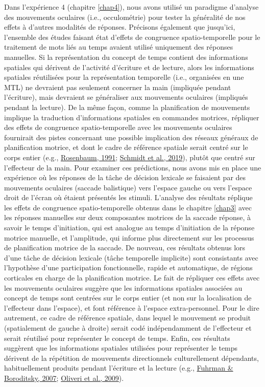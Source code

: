 \documentclass[
  a4paper,12pt,twoside,onecolumn,openright,final,oldfontcommands]{memoir}
\begin{document}
Dans l'expérience 4 (chapitre \ref{chap4}), nous avons utilisé un paradigme d'analyse des mouvements oculaires (i.e., occulométrie) pour tester la généralité de nos effets à d'autres modalités de réponses. Précisons également que jusqu'ici, l'ensemble des études faisant état d'effets de congruence spatio-temporelle pour le traitement de mots liés au temps avaient utilisé uniquement des réponses manuelles. Si la représentation du concept de temps contient des informations spatiales qui dérivent de l'activité d'écriture et de lecture, alors les informations spatiales réutilisées pour la représentation temporelle (i.e., organisées en une MTL) ne devraient pas seulement concerner la main (impliquée pendant l'écriture), mais devraient se généraliser aux mouvements oculaires (impliqués pendant la lecture). De la même façon, comme la planification de mouvements implique la traduction d'informations spatiales en commandes motrices, répliquer des effets de congruence spatio-temporelle avec les mouvements oculaires fournirait des pistes concernant une possible implication des réseaux généraux de planification motrice, et dont le cadre de référence spatiale serait centré sur le corps entier (e.g., \protect\hyperlink{ref-rosenbaum_human_1991}{Rosenbaum, 1991}; \protect\hyperlink{ref-schmidt_motor_2019}{Schmidt et al., 2019}), plutôt que centré sur l'effecteur de la main. Pour examiner ces prédictions, nous avons mis en place une expérience où les réponses de la tâche de décision lexicale se faisaient par des mouvements oculaires (saccade balistique) vers l'espace gauche ou vers l'espace droit de l'écran où étaient présentés les stimuli. L'analyse des résultats réplique les effets de congruence spatio-temporelle obtenus dans le chapitre \ref{chap3} avec les réponses manuelles sur deux composantes motrices de la saccade réponse, à savoir le temps d'initiation, qui est analogue au temps d'initiation de la réponse motrice manuelle, et l'amplitude, qui informe plus directement sur les processus de planification motrice de la saccade. De nouveau, ces résultats obtenus lors d'une tâche de décision lexicale (tâche temporelle implicite) sont consistants avec l'hypothèse d'une participation fonctionnelle, rapide et automatique, de régions corticales en charge de la planification motrice. Le fait de répliquer ces effets avec les mouvements oculaires suggère que les informations spatiales associées au concept de temps sont centrées sur le corps entier (et non sur la localisation de l'effecteur dans l'espace), et font référence à l'espace extra-personnel. Pour le dire autrement, ce cadre de référence spatiale, dans lequel le mouvement se produit (spatialement de gauche à droite) serait codé indépendamment de l'effecteur et serait réutilisé pour représenter le concept de temps. Enfin, ces résultats suggèrent que les informations spatiales utilisées pour représenter le temps dérivent de la répétition de mouvements directionnels culturellement dépendants, habituellement produits pendant l'écriture et la lecture (e.g., \protect\hyperlink{ref-fuhrman_mental_2007}{Fuhrman \& Boroditsky, 2007}; \protect\hyperlink{ref-oliveri_representation_2009}{Oliveri et al., 2009}).
\end{document}
